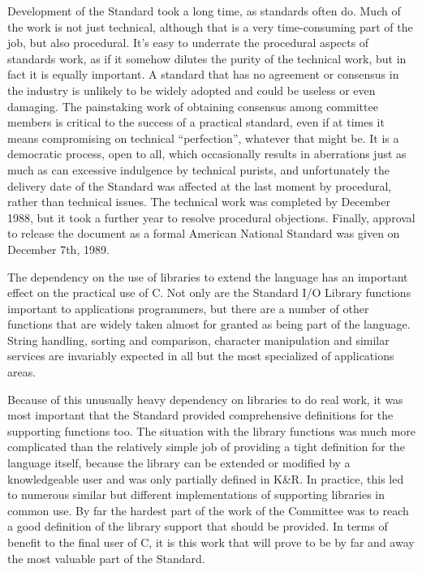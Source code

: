   Development of the Standard took a long time, as standards often do. Much
   of the work is not just technical, although that is a very time-consuming
   part of the job, but also procedural. It's easy to underrate the procedural
   aspects of standards work, as if it somehow dilutes the purity of the
   technical work, but in fact it is equally important. A standard that has no
   agreement or consensus in the industry is unlikely to be widely adopted and
   could be useless or even damaging. The painstaking work of obtaining
   consensus among committee members is critical to the success of a practical
   standard, even if at times it means compromising on technical
   ``perfection'', whatever that might be. It is a democratic
   process, open to all, which occasionally results in aberrations just as
   much as can excessive indulgence by technical purists, and unfortunately
   the delivery date of the Standard was affected at the last moment by
   procedural, rather than technical issues. The technical work was completed
   by December 1988, but it took a further year to resolve procedural
   objections. Finally, approval to release the document as a formal American
   National Standard was given on December 7th, 1989.


 

  

  The dependency on the use of libraries to extend the language has an
   important effect on the practical use of C. Not only are the Standard
   I/O Library functions important to applications programmers, but there are
   a number of other functions that are widely taken almost for granted as
   being part of the language. String handling, sorting and comparison,
   character manipulation and similar services are invariably expected in all
   but the most specialized of applications areas.


  Because of this unusually heavy dependency on libraries to do real work,
   it was most important that the Standard provided comprehensive definitions
   for the supporting functions too. The situation with the library functions
   was much more complicated than the relatively simple job of providing a
   tight definition for the language itself, because the library can be
   extended or modified by a knowledgeable user and was only partially defined
   in K\&R. In practice, this led to numerous similar but different
   implementations of supporting libraries in common use. By far the hardest
   part of the work of the Committee was to reach a good definition of the
   library support that should be provided. In terms of benefit to the final
   user of C, it is this work that will prove to be by far and away the
   most valuable part of the Standard.


